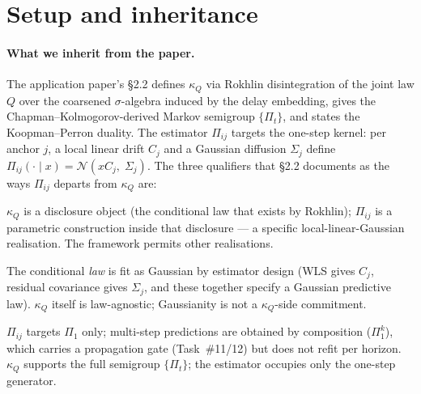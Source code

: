 \documentclass[11pt]{article}
\newcommand{\kQ}{\kappa_{Q}}
\newcommand{\Pij}{\Pi_{ij}}
\newcommand{\Sj}{\Sigma_{j}}
\newcommand{\Cj}{C_{j}}
\newcommand{\Nrm}{\mathcal{N}}
\begin{document}
\section{Setup and inheritance}
\label{sec:setup}

\paragraph{What we inherit from the paper.} The application paper's
\S2.2 defines \(\kQ\) via Rokhlin disintegration of the joint law
\(Q\) over the coarsened \(\sigma\)-algebra induced by the delay
embedding, gives the Chapman--Kolmogorov-derived Markov semigroup
\(\{\Pi_t\}\), and states the Koopman--Perron duality. The estimator
\(\Pij\) targets the one-step kernel: per anchor \(j\), a local
linear drift \(\Cj\) and a Gaussian diffusion \(\Sj\) define
\(\Pij(\cdot \mid x) = \Nrm(x\Cj,\; \Sj)\). The three qualifiers
that \S2.2 documents as the ways \(\Pij\) departs from \(\kQ\) are:

\begin{description}[leftmargin=2em]
  \item[Register.] \(\kQ\) is a disclosure object (the conditional
  law that exists by Rokhlin); \(\Pij\) is a parametric construction
  inside that disclosure --- a specific local-linear-Gaussian
  realisation. The framework permits other realisations.
  \item[Imposed Gaussianity.] The conditional \emph{law} is fit as
  Gaussian by estimator design (WLS gives \(\Cj\), residual
  covariance gives \(\Sj\), and these together specify a Gaussian
  predictive law). \(\kQ\) itself is law-agnostic; Gaussianity is
  not a \(\kQ\)-side commitment.
  \item[Single step.] \(\Pij\) targets \(\Pi_1\) only; multi-step
  predictions are obtained by composition (\(\Pi_1^k\)), which carries
  a propagation gate (Task~\#11/12) but does not refit per horizon.
  \(\kQ\) supports the full semigroup \(\{\Pi_t\}\); the estimator
  occupies only the one-step generator.
\end{description}
\end{document}
